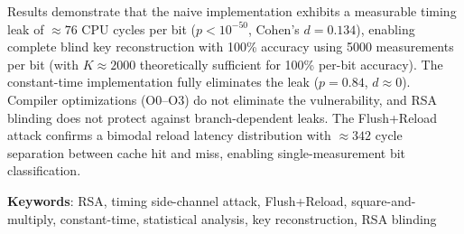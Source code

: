 Results demonstrate that the naive implementation exhibits a measurable timing leak of $\approx 76$ CPU cycles per bit ($p < 10^{-50}$, Cohen's $d = 0.134$), enabling complete blind key reconstruction with 100\% accuracy using 5000 measurements per bit (with $K \approx 2000$ theoretically sufficient for 100\% per-bit accuracy). The constant-time implementation fully eliminates the leak ($p = 0.84$, $d \approx 0$). Compiler optimizations (O0--O3) do not eliminate the vulnerability, and RSA blinding does not protect against branch-dependent leaks. The Flush+Reload attack confirms a bimodal reload latency distribution with $\approx 342$ cycle separation between cache hit and miss, enabling single-measurement bit classification.

\bigskip
\textbf{Keywords}: RSA, timing side-channel attack, Flush+Reload, square-and-multiply, constant-time, statistical analysis, key reconstruction, RSA blinding
